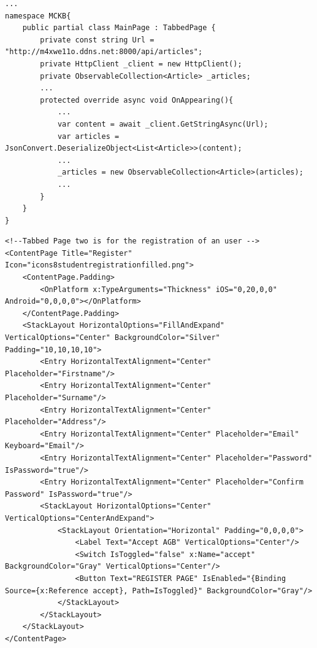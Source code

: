 	\begin{lstlisting}[caption={MCKB Code-behind - Webservice Call},label={lst:mckbcodereg},captionpos=b,style=csharp]
...
namespace MCKB{
    public partial class MainPage : TabbedPage {
        private const string Url = "http://m4xwe11o.ddns.net:8000/api/articles";
        private HttpClient _client = new HttpClient();
        private ObservableCollection<Article> _articles;
		...
        protected override async void OnAppearing(){
        	...
            var content = await _client.GetStringAsync(Url);
            var articles = JsonConvert.DeserializeObject<List<Article>>(content);
			...
            _articles = new ObservableCollection<Article>(articles);
            ...
        }
    }
}

	\end{lstlisting}

	\begin{lstlisting}[caption={MCKB XAML Code für Registrierung},label={lst:mckbcodereg},captionpos=b,style=XML-Own]
<!--Tabbed Page two is for the registration of an user -->
<ContentPage Title="Register" Icon="icons8studentregistrationfilled.png">
    <ContentPage.Padding>
        <OnPlatform x:TypeArguments="Thickness" iOS="0,20,0,0" Android="0,0,0,0"></OnPlatform>
    </ContentPage.Padding>
    <StackLayout HorizontalOptions="FillAndExpand" VerticalOptions="Center" BackgroundColor="Silver" Padding="10,10,10,10">
        <Entry HorizontalTextAlignment="Center" Placeholder="Firstname"/>
        <Entry HorizontalTextAlignment="Center" Placeholder="Surname"/>
        <Entry HorizontalTextAlignment="Center" Placeholder="Address"/>
        <Entry HorizontalTextAlignment="Center" Placeholder="Email" Keyboard="Email"/>
        <Entry HorizontalTextAlignment="Center" Placeholder="Password" IsPassword="true"/>
        <Entry HorizontalTextAlignment="Center" Placeholder="Confirm Password" IsPassword="true"/>
        <StackLayout HorizontalOptions="Center" VerticalOptions="CenterAndExpand">
            <StackLayout Orientation="Horizontal" Padding="0,0,0,0">
                <Label Text="Accept AGB" VerticalOptions="Center"/>
                <Switch IsToggled="false" x:Name="accept" BackgroundColor="Gray" VerticalOptions="Center"/>
                <Button Text="REGISTER PAGE" IsEnabled="{Binding Source={x:Reference accept}, Path=IsToggled}" BackgroundColor="Gray"/>
            </StackLayout>
        </StackLayout>
    </StackLayout>
</ContentPage>
	\end{lstlisting}


